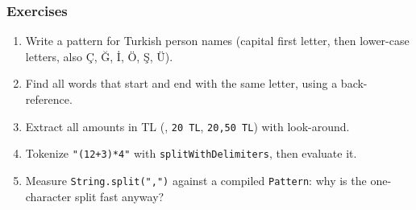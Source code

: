 \documentclass[aspectratio=169,10pt,compress]{beamer}
\begin{document}
\begin{frame}[t,fragile] \frametitle{Exercises}
  \begin{enumerate}\small
    \item Write a pattern for Turkish person names (capital first letter, then lower-case letters, also Ç, Ğ, İ, Ö, Ş, Ü).
    \item Find all words that start and end with the same letter, using a back-reference.
    \item Extract all amounts in TL (\texttt{}, \texttt{20 TL}, \texttt{20,50 TL}) with look-around.
    \item Tokenize \texttt{"(12+3)*4"} with \texttt{splitWithDelimiters}, then evaluate it.
    \item Measure \texttt{String.split(",")} against a compiled \texttt{Pattern}: why is the one-character split fast anyway?
  \end{enumerate}
\end{frame}




\begin{frame}[t,fragile]
	\begin{center}
		\vspace{4cm}
	\end{center}
\end{frame}
\end{document}
